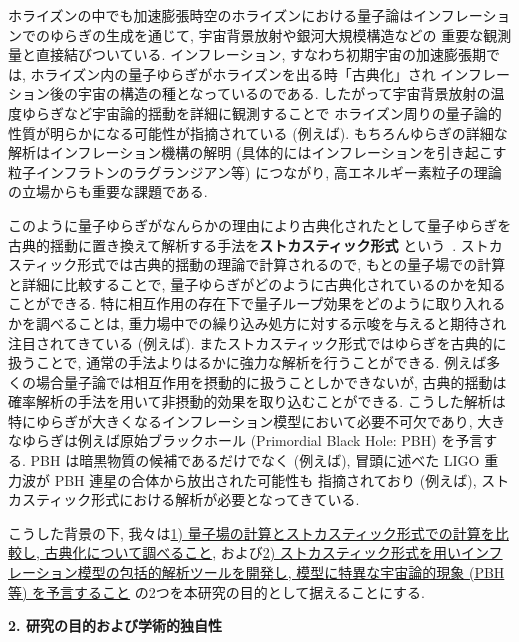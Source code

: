 \documentclass[11pt,a4j,dvipdfmx]{jarticle} 					%
\newcommand{\研究課題名}{\mgfamily\sffamily ストカスティック形式で迫る重力と量子論}
\newcommand{\研究機関名}{\mgfamily\sffamily 名古屋大学}
\newcommand{\研究代表者氏名}{\mgfamily\sffamily 多田祐一郎}
\newcommand{\研究期間の最終元号年度}{34}  %
\renewcommand{\emph}[1]{{\sffamily\gtfamily\bfseries #1}}
\begin{document}
ホライズンの中でも加速膨張時空のホライズンにおける量子論はインフレーションでのゆらぎの生成を通じて, 宇宙背景放射や銀河大規模構造などの
重要な観測量と直接結びついている. インフレーション, すなわち初期宇宙の加速膨張期では, ホライズン内の量子ゆらぎがホライズンを出る時「古典化」され
インフレーション後の宇宙の構造の種となっているのである. したがって宇宙背景放射の温度ゆらぎなど宇宙論的揺動を詳細に観測することで
ホライズン周りの量子論的性質が明らかになる可能性が指摘されている (例えば\cite{Maldacena:2015bha}).
もちろんゆらぎの詳細な解析はインフレーション機構の解明 (具体的にはインフレーションを引き起こす粒子インフラトンのラグランジアン等) につながり,
高エネルギー素粒子の理論の立場からも重要な課題である.

このように量子ゆらぎがなんらかの理由により古典化されたとして量子ゆらぎを古典的揺動に置き換えて解析する手法を\emph{ストカスティック形式}
という~\cite{Starobinsky:1986fx}. ストカスティック形式では古典的揺動の理論で計算されるので, もとの量子場での計算と詳細に比較することで,
量子ゆらぎがどのように古典化されているのかを知ることができる. 特に相互作用の存在下で量子ループ効果をどのように取り入れるかを調べることは,
重力場中での繰り込み処方に対する示唆を与えると期待され注目されてきている (例えば\cite{Tokuda:2017fdh}).
またストカスティック形式ではゆらぎを古典的に扱うことで, 通常の手法よりはるかに強力な解析を行うことができる.
例えば多くの場合量子論では相互作用を摂動的に扱うことしかできないが, 古典的揺動は確率解析の手法を用いて非摂動的効果を取り込むことができる.
こうした解析は特にゆらぎが大きくなるインフレーション模型において必要不可欠であり, 大きなゆらぎは例えば原始ブラックホール (Primordial Black Hole: PBH)
を予言する. PBH は暗黒物質の候補であるだけでなく (例えば\cite{Carr:2016drx}), 冒頭に述べた LIGO 重力波が PBH 連星の合体から放出された可能性も
指摘されており (例えば\cite{Sasaki:2016jop}), ストカスティック形式における解析が必要となってきている.

こうした背景の下, 我々は\ul{1) 量子場の計算とストカスティック形式での計算を比較し,
古典化について調べること}, および\ul{2) ストカスティック形式を用いインフレーション模型の包括的解析ツールを開発し, 模型に特異な宇宙論的現象 (PBH等) 
を予言すること} の2つを本研究の目的として据えることにする.



\begin{mdframed}[roundcorner=0.5zw,
	innertopmargin=0.8zw,innerbottommargin=0.8zw,
	linecolor=black!50,linewidth=0.2zw,
	backgroundcolor=black!10]
	{\bfseries\gtfamily\sffamily\large 2. 研究の目的および学術的独自性}
\end{mdframed}
\end{document}

